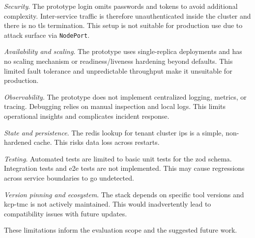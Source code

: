 \documentclass[11pt, a4paper, oneside, listof=totoc]{scrartcl}
\begin{document}
\begin{enumerate}[label={[\arabic*]:},
                    ref=Challenge~\arabic*,
                    leftmargin=*,
                    itemsep=0.6\baselineskip]
                    \item\label{chal:securityRisks}
                        \textit{Security}.
                        The prototype login omits passwords and tokens to avoid additional
                        complexity.
                        Inter-service traffic is therefore unauthenticated inside the cluster and
                        there is no \gls{tls} termination.
                        This setup is not suitable for production use due to attack surface via
                        \texttt{NodePort}.

                    \item\label{chal:availabilityAndScaling}
                        \textit{Availability and scaling}.
                        The prototype uses single-replica deployments and has no scaling mechanism
                        or readiness/liveness hardening beyond defaults.
                        This limited fault tolerance and unpredictable throughput make it unsuitable
                        for production.

                    \item\label{chal:observability}
                        \textit{Observability}.
                        The prototype does not implement centralized logging, metrics, or tracing.
                        Debugging relies on manual inspection and local logs.
                        This limits operational insights and complicates incident response.

                    \item\label{chal:stateAndPersistence}
                        \textit{State and persistence}.
                        The redis lookup for tenant cluster \glspl{ip} is a simple, non-hardened
                        cache.
                        This risks data loss across restarts.

                    \item\label{chal:testing}
                        \textit{Testing}.
                        Automated tests are limited to basic unit tests for the zod schema.
                        Integration tests and \gls{e2e} tests are not implemented.
                        This may cause regressions across service boundaries to go undetected.

                    \item\label{chal:versionPinning}
                        \textit{Version pinning and ecosystem}.
                        The stack depends on specific tool versions and \gls{kcp}-\gls{tmc} is not
                        actively maintained.
                        This would inadvertently lead to compatibility issues with future updates.
            \end{enumerate}
            These limitations inform the evaluation scope and the suggested future work.
\end{document}
